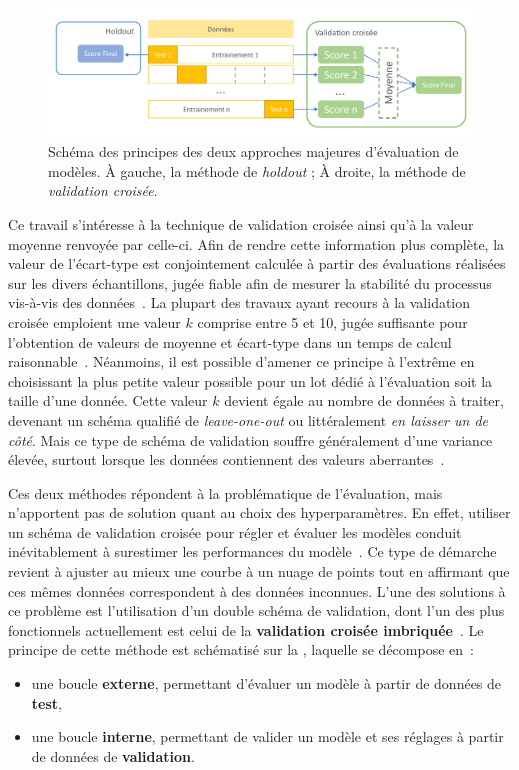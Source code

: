 \begin{figure}[H]
    \centering
    \includegraphics[width=\textwidth]{contents/chapter_3/resources/scheme_holdout_cv.pdf}
    \caption{Schéma des principes des deux approches majeures d'évaluation de modèles. À gauche, la méthode de \textit{holdout} ; À droite, la méthode de \textit{validation croisée}.}
    \label{fig:scheme_holdout_cv}
\end{figure}

Ce travail s'intéresse à la technique de validation croisée ainsi qu'à la valeur moyenne renvoyée par celle-ci. Afin de rendre cette information plus complète, la valeur de l'écart-type est conjointement calculée à partir des évaluations réalisées sur les divers échantillons, jugée fiable afin de mesurer la stabilité du processus vis-à-vis des données~\cite{Kim2009}. La plupart des travaux ayant recours à la validation croisée emploient une valeur $k$ comprise entre 5 et 10, jugée suffisante pour l'obtention de valeurs de moyenne et écart-type dans un temps de calcul raisonnable~\cite{James2000}. Néanmoins, il est possible d'amener ce principe à l'extrême en choisissant la plus petite valeur possible pour un lot dédié à l'évaluation soit la taille d'une donnée. Cette valeur $k$ devient égale au nombre de données à traiter, devenant un schéma qualifié de \textit{leave-one-out} ou littéralement \textit{en laisser un de côté}. Mais ce type de schéma de validation souffre généralement d'une variance élevée, surtout lorsque les données contiennent des valeurs aberrantes~\cite{Bengio2004}.\par

Ces deux méthodes répondent à la problématique de l'évaluation, mais n'apportent pas de solution quant au choix des hyperparamètres. En effet, utiliser un schéma de validation croisée pour régler et évaluer les modèles conduit inévitablement à surestimer les performances du modèle~\cite{Tsamardinos2014}. Ce type de démarche revient à ajuster au mieux une courbe à un nuage de points tout en affirmant que ces mêmes données correspondent à des données inconnues. L'une des solutions à ce problème est l'utilisation d'un double schéma de validation, dont l'un des plus fonctionnels actuellement est celui de la \textbf{validation croisée imbriquée}~\cite{Cawley2010}. Le principe de cette méthode est schématisé sur la , laquelle se décompose en~:
\begin{itemize}
    \item une boucle \textbf{externe}, permettant d'évaluer un modèle à partir de données de \textbf{test},
    \item une boucle \textbf{interne}, permettant de valider un modèle et ses réglages à partir de données de \textbf{validation}.
\end{itemize}\par
  
